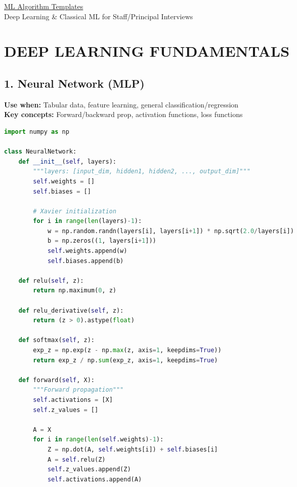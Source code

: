 \documentclass[8pt,landscape]{article}
\begin{document}
\raggedright
\scriptsize
\begin{multicols}{3}

\setlength{\premulticols}{1pt}
\setlength{\postmulticols}{1pt}
\setlength{\multicolsep}{1pt}
\setlength{\columnsep}{2pt}

\begin{center}
     \Large{\underline{ML Algorithm Templates}} \\
     \small{Deep Learning \& Classical ML for Staff/Principal Interviews}
\end{center}

\section*{DEEP LEARNING FUNDAMENTALS}

\subsection*{1. Neural Network (MLP)}
\textbf{Use when:} Tabular data, feature learning, general classification/regression \\
\textbf{Key concepts:} Forward/backward prop, activation functions, loss functions
\begin{lstlisting}[language=Python]
import numpy as np

class NeuralNetwork:
    def __init__(self, layers):
        """layers: [input_dim, hidden1, hidden2, ..., output_dim]"""
        self.weights = []
        self.biases = []

        # Xavier initialization
        for i in range(len(layers)-1):
            w = np.random.randn(layers[i], layers[i+1]) * np.sqrt(2.0/layers[i])
            b = np.zeros((1, layers[i+1]))
            self.weights.append(w)
            self.biases.append(b)

    def relu(self, z):
        return np.maximum(0, z)

    def relu_derivative(self, z):
        return (z > 0).astype(float)

    def softmax(self, z):
        exp_z = np.exp(z - np.max(z, axis=1, keepdims=True))
        return exp_z / np.sum(exp_z, axis=1, keepdims=True)

    def forward(self, X):
        """Forward propagation"""
        self.activations = [X]
        self.z_values = []

        A = X
        for i in range(len(self.weights)-1):
            Z = np.dot(A, self.weights[i]) + self.biases[i]
            A = self.relu(Z)
            self.z_values.append(Z)
            self.activations.append(A)


\end{lstlisting}
\end{multicols}
\end{document}
